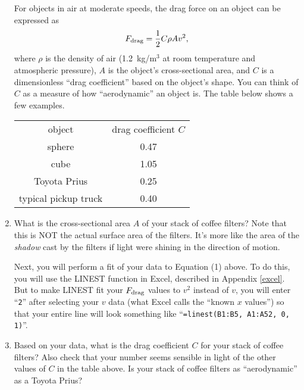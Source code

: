 \begin{enumerate}[labparts]
For objects in air at moderate speeds, the drag force on an object can be expressed as
\begin{equation}
F_{\rm drag} = \frac{1}{2}C \rho A v^2,
\end{equation}
where $\rho$ is the density of air (1.2~kg/m$^3$ at room temperature and atmospheric pressure), 
$A$ is the object's cross-sectional area, and 
$C$ is a dimensionless ``drag coefficient'' based on the object's shape.  
You can think of $C$ as a measure of how ``aerodynamic'' an object is.  The table below shows a few examples.

\begin{center}
{\renewcommand{\arraystretch}{1.2}
\begin{tabular}{|c | c |}
\hline
object & drag coefficient $C$ \\ 
\hhline{|=|=|}
sphere & 0.47 \\ \hline
cube & 1.05 \\ \hline
Toyota Prius & 0.25 \\ \hline
typical pickup truck & 0.40 \\ \hline
\end{tabular}
}
\end{center}

\item What is the cross-sectional area $A$ of your stack of coffee filters?  Note that this is NOT the actual surface area of the filters.  It's more like the area of the \textit{shadow} cast by the filters if light were shining in the direction of motion.
\answerspace{0.8in}


Next, you will perform a fit of your data to Equation (1) above.  To do this, you will use the LINEST function in Excel, described in Appendix \ref{excel}.  But to make LINEST fit your $F_{\rm drag}$ values to $v^2$ instead of $v$, you will enter ``\specialcaret \verb!2!'' after selecting your $v$ data (what Excel calls the ``known $x$ values'') so that your entire line will look something like ``\verb!=linest(B1:B5, A1:A5!\specialcaret \verb!2, 0, 1)!''.
\item Based on your data, what is the drag coefficient $C$ for your stack of coffee filters?  Also check that your number seems sensible in light of the other values of $C$ in the table above.  Is your stack of coffee filters as ``aerodynamic'' as a Toyota Prius?
\answerspace{0.8in}


\end{enumerate}

